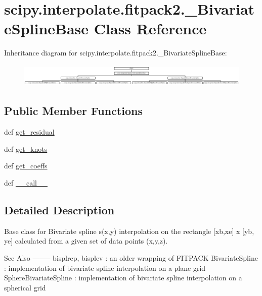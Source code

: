 \hypertarget{classscipy_1_1interpolate_1_1fitpack2_1_1__BivariateSplineBase}{}\section{scipy.\+interpolate.\+fitpack2.\+\_\+\+Bivariate\+Spline\+Base Class Reference}
\label{classscipy_1_1interpolate_1_1fitpack2_1_1__BivariateSplineBase}
Inheritance diagram for scipy.\+interpolate.\+fitpack2.\+\_\+\+Bivariate\+Spline\+Base\+:\begin{figure}[H]
\begin{center}
\leavevmode
\includegraphics[height=1.124498cm]{classscipy_1_1interpolate_1_1fitpack2_1_1__BivariateSplineBase}
\end{center}
\end{figure}
\subsection*{Public Member Functions}
\begin{DoxyCompactItemize}
\item 
def \hyperlink{classscipy_1_1interpolate_1_1fitpack2_1_1__BivariateSplineBase_a31961c131cec5c48769d2c2580209618}{get\+\_\+residual}
\item 
def \hyperlink{classscipy_1_1interpolate_1_1fitpack2_1_1__BivariateSplineBase_abadc64cb21b44d09fafd155d51361095}{get\+\_\+knots}
\item 
def \hyperlink{classscipy_1_1interpolate_1_1fitpack2_1_1__BivariateSplineBase_a5d9fbc935427e01c099481a9aefac720}{get\+\_\+coeffs}
\item 
def \hyperlink{classscipy_1_1interpolate_1_1fitpack2_1_1__BivariateSplineBase_a9ddc5a26b65017790ef0cf71fb52b485}{\+\_\+\+\_\+call\+\_\+\+\_\+}
\end{DoxyCompactItemize}


\subsection{Detailed Description}
\begin{DoxyVerb}Base class for Bivariate spline s(x,y) interpolation on the rectangle
[xb,xe] x [yb, ye] calculated from a given set of data points
(x,y,z).

See Also
--------
bisplrep, bisplev : an older wrapping of FITPACK
BivariateSpline :
    implementation of bivariate spline interpolation on a plane grid
SphereBivariateSpline :
    implementation of bivariate spline interpolation on a spherical grid
\end{DoxyVerb}
 

